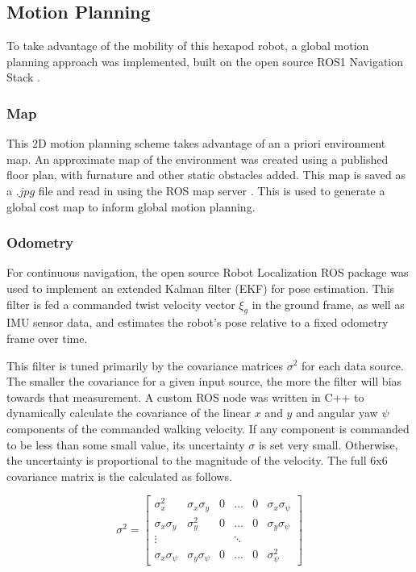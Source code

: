 \subsection{ Motion Planning }

To take advantage of the mobility of this hexapod robot, a global motion planning approach was implemented, built on the open source ROS1 Navigation Stack \cite{navstack}.

\subsubsection{ Map }
This 2D motion planning scheme takes advantage of an a priori environment map. An approximate map of the environment was created using a published floor plan, with furnature and other static obstacles added. This map is saved as a $.jpg$ file and read in using the ROS map server \cite{mapserver}. This is used to generate a global cost map to inform global motion planning.

\subsubsection{ Odometry }
For continuous navigation, the open source Robot Localization ROS package \cite{robotlocalization} was used to implement an extended Kalman filter (EKF) for pose estimation. This filter is fed a commanded twist velocity vector $\xi_g$ in the ground frame, as well as IMU sensor data, and estimates the robot's pose relative to a fixed odometry frame over time.

This filter is tuned primarily by the covariance matrices $\sigma^2$ for each data source. The smaller the covariance for a given input source, the more the filter will bias towards that measurement. A custom ROS node was written in C++ to dynamically calculate the covariance of the linear $x$ and $y$ and angular yaw $\psi$ components of the commanded walking velocity. If any component is commanded to be less than some small value, its uncertainty $\sigma$ is set very small. Otherwise, the uncertainty is proportional to the magnitude of the velocity. The full 6x6 covariance matrix is the calculated as follows.

\begin{equation}
    \sigma^2 =
    \begin{bmatrix}
        \sigma_x^2 & \sigma_x \sigma_y & 0 & \ldots & 0 & \sigma_x \sigma_{\psi} \\
        \sigma_x \sigma_y & \sigma_y^2 & 0 & \ldots & 0 & \sigma_y \sigma_{\psi} \\
        \vdots &  &  & \ddots &  &  \\
        \sigma_x \sigma_{\psi} & \sigma_y \sigma_{\psi} & 0 & ... & 0 & \sigma_{\psi}^2
    \end{bmatrix}
\end{equation}

